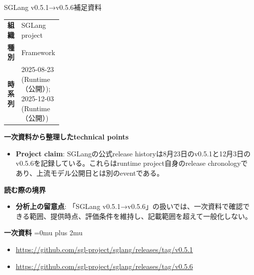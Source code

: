 \begin{technicalnote}{SGLang v0.5.1→v0.5.6}{補足資料}
\begingroup
\begin{tabularx}{\linewidth}{@{}>{\bfseries}p{0.22\linewidth}X@{}}
組織 & SGLang project \\
種別 & Framework \\
時系列 & 2025-08-23 (Runtime（公開）); 2025-12-03 (Runtime（公開）) \\
\end{tabularx}
\smallskip
{\bfseries 一次資料から整理したtechnical points}
\begin{itemize}[leftmargin=1.5em,itemsep=0.35em]
\item \textbf{Project claim}: SGLangの公式release historyは8月23日のv0.5.1と12月3日のv0.5.6を記録している。これらはruntime project自身のrelease chronologyであり、上流モデル公開日とは別のeventである。
\end{itemize}
\begin{minipage}{\linewidth}
{\bfseries 読む際の境界}
\begin{itemize}[leftmargin=1.5em,itemsep=0.35em]
\item \textbf{分析上の留意点}: 「SGLang v0.5.1→v0.5.6」の扱いでは、一次資料で確認できる範囲、提供時点、評価条件を維持し、記載範囲を超えて一般化しない。
\end{itemize}
\begin{samepage}
{\bfseries 一次資料}
\begingroup\sloppy
\Urlmuskip=0mu plus 2mu\relax
\begin{itemize}[leftmargin=1.5em,itemsep=0.25em]
\item {\scriptsize\url{https://github.com/sgl-project/sglang/releases/tag/v0.5.1}}
\item {\scriptsize\url{https://github.com/sgl-project/sglang/releases/tag/v0.5.6}}
\end{itemize}
\endgroup
\end{samepage}
\end{minipage}
\endgroup
\end{technicalnote}
\medskip

